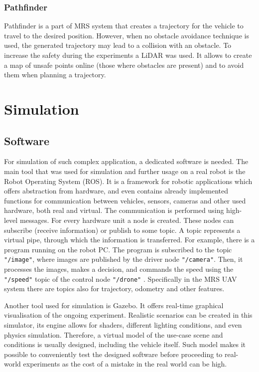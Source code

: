 \subsection{Pathfinder}

Pathfinder is a part of \acs{MRS} system that creates a trajectory for the vehicle to travel to the desired position. However, when no obstacle avoidance technique is used, the generated trajectory may lead to a collision with an obstacle. To increase the safety during the experiments a \acs{LiDAR} was used. It allows to create a map of unsafe points online (those where obstacles are present) and to avoid them when planning a trajectory.


\chapter{Simulation}



\section{Software}

For simulation of such complex application, a dedicated software is needed. The main tool that was used for simulation and further usage on a real robot is the Robot Operating System (\acs{ROS}). It is a framework for robotic applications which offers abstraction from hardware, and even contains already implemented functions for communication between vehicles, sensors, cameras and other used hardware, both real and virtual. 
The communication is performed using high-level messages. For every hardware unit a node is created. These nodes can subscribe (receive information) or publish to some topic. A topic represents a virtual pipe, through which the information is transferred. For example, there is a program running on the robot PC. The program is subscribed to the topic \texttt{"/image"}, where images are published by the driver node \texttt{"/camera"}. Then, it processes the images, makes a decision, and commands the speed using the \texttt{"/speed"} topic of the control node \texttt{"/drone"} \cite{quigley2009ros}. Specifically in the \acs{MRS} \acs{UAV} system there are topics also for trajectory, odometry and other features.

Another tool used for simulation is Gazebo. It offers real-time graphical visualisation of the ongoing experiment. Realistic scenarios can be created in this simulator, its engine allows for shaders, different lighting conditions, and even physics simulation. Therefore, a virtual model of the use-case scene and conditions is usually designed, including the vehicle itself. Such model makes it possible to conveniently test the designed software before proceeding to real-world experiments as the cost of a mistake in the real world can be high. 

